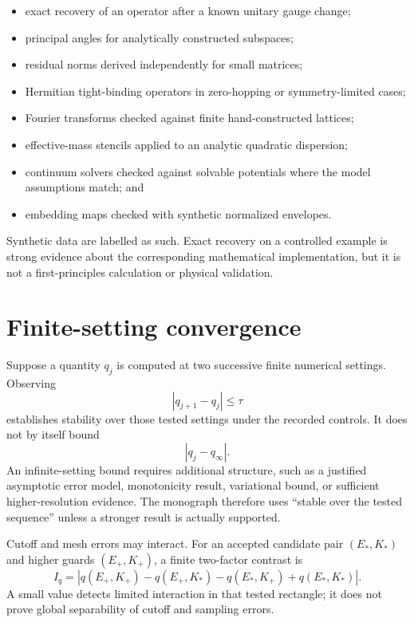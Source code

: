 \begin{itemize}
  \item exact recovery of an operator after a known unitary gauge change;
  \item principal angles for analytically constructed subspaces;
  \item residual norms derived independently for small matrices;
  \item Hermitian tight-binding operators in zero-hopping or symmetry-limited
    cases;
  \item Fourier transforms checked against finite hand-constructed lattices;
  \item effective-mass stencils applied to an analytic quadratic dispersion;
  \item continuum solvers checked against solvable potentials where the model
    assumptions match; and
  \item embedding maps checked with synthetic normalized envelopes.
\end{itemize}

Synthetic data are labelled as such. Exact recovery on a controlled example is
strong evidence about the corresponding mathematical implementation, but it is
not a first-principles calculation or physical validation.

\section{Finite-setting convergence}

Suppose a quantity $q_j$ is computed at two successive finite numerical
settings. Observing
\begin{equation}
  |q_{j+1}-q_j|\leq\tau
\end{equation}
establishes stability over those tested settings under the recorded controls. It
does not by itself bound
\begin{equation}
  |q_j-q_{\infty}|.
\end{equation}
An infinite-setting bound requires additional structure, such as a justified
asymptotic error model, monotonicity result, variational bound, or sufficient
higher-resolution evidence. The monograph therefore uses ``stable over the
tested sequence'' unless a stronger result is actually supported.

Cutoff and mesh errors may interact. For an accepted candidate pair
$(E_{\ast},K_{\ast})$ and higher guards $(E_{+},K_{+})$, a finite two-factor
contrast is
\begin{equation}
  I_q=
  \left|
    q(E_{+},K_{+})-q(E_{+},K_{\ast})
    -q(E_{\ast},K_{+})+q(E_{\ast},K_{\ast})
  \right|.
\end{equation}
A small value detects limited interaction in that tested rectangle; it does not
prove global separability of cutoff and sampling errors.

